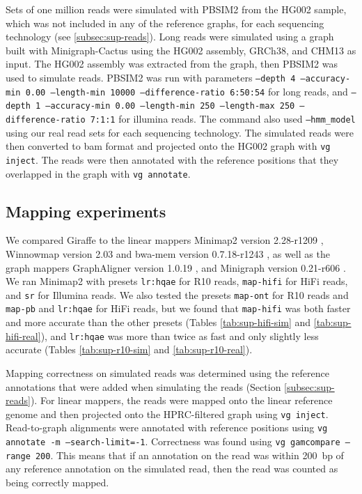 \documentclass[11pt]{ucscthesis}
\begin{document}
Sets of one million reads were simulated with PBSIM2 \citep{ono_pbsim2_2020} from the HG002 sample, which was not included in any of the reference graphs, for each sequencing technology (see \ref{subsec:sup-reads}).
Long reads were simulated using a graph built with Minigraph-Cactus using the HG002 assembly, GRCh38, and CHM13 as input.
The HG002 assembly was extracted from the graph, then PBSIM2 was used to simulate reads.
PBSIM2 was run with parameters \texttt{--depth 4 --accuracy-min 0.00 --length-min 10000 --difference-ratio 6:50:54} for long reads, and \texttt{--depth 1 --accuracy-min 0.00 --length-min 250 --length-max 250 --difference-ratio 7:1:1} for illumina reads.
The command also used \texttt{--hmm\_model} using our real read sets for each sequencing technology.
The simulated reads were then converted to bam format and projected onto the HG002 graph with \texttt{vg inject}.
The reads were then annotated with the reference positions that they overlapped in the graph with \texttt{vg annotate}.

\subsection{Mapping experiments}
We compared Giraffe to the linear mappers Minimap2 version 2.28-r1209 \cite{minimap2_2021}, Winnowmap version 2.03 \citep{winnowmap2_2022} and bwa-mem version 0.7.18-r1243 \cite{li_bwa_mem_2013}, as well as the graph mappers GraphAligner version 1.0.19 \cite{rautiainen_graphaligner_2020}, and Minigraph version 0.21-r606 \cite{li_minigraph_2020}.
We ran Minimap2 with presets \texttt{lr:hqae} for R10 reads, \texttt{map-hifi} for HiFi reads, and \texttt{sr} for Illumina reads.
We also tested the presets \texttt{map-ont} for R10 reads and \texttt{map-pb} and \texttt{lr:hqae} for HiFi reads, but we found that \texttt{map-hifi} was both faster and more accurate than the other presets (Tables \ref{tab:sup-hifi-sim} and \ref{tab:sup-hifi-real}), and \texttt{lr:hqae} was more than twice as fast and only slightly less accurate (Tables \ref{tab:sup-r10-sim} and \ref{tab:sup-r10-real}).

Mapping correctness on simulated reads was determined using the reference annotations that were added when simulating the reads (Section \ref{subsec:sup-reads}).
For linear mappers, the reads were mapped onto the linear reference genome and then projected onto the HPRC-filtered graph using \texttt{vg inject}.
Read-to-graph alignments were annotated with reference positions using \texttt{vg annotate -m --search-limit=-1}.
Correctness was found using \texttt{vg gamcompare --range 200}.
This means that if an annotation on the read was within 200~bp of any reference annotation on the simulated read, then the read was counted as being correctly mapped.
\end{document}
